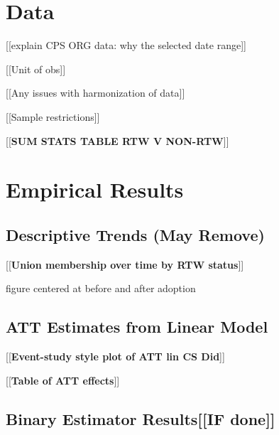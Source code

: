\section{Data}
[[explain CPS ORG data: why the selected date range]]

[[Unit of obs]]




[[Any issues with harmonization of data]]

[[Sample restrictions]]

[[\textbf{SUM STATS TABLE RTW V NON-RTW}]]


\section{Empirical Results}
\subsection{Descriptive Trends (May Remove)}
[[\textbf{Union membership over time by RTW status}]]

figure centered at before and after adoption

\subsection{ATT Estimates from Linear Model}

[[\textbf{Event-study style plot of ATT lin CS Did}]]

[[\textbf{Table of ATT effects}]]

\subsection{Binary Estimator Results[[IF done]]}

